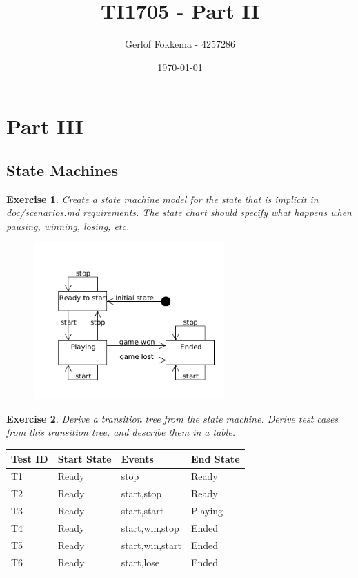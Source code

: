 \documentclass[a4paper]{article}
\title{TI1705 - Part II}
\author{Gerlof Fokkema - 4257286}
\date{\today}
\newtheorem{thm}{Exercise}
\begin{document}
  \maketitle
  \section{Part III}
  
  \subsection{State Machines}
    \begin{thm}
      Create a state machine model for the state that is implicit in \textit{doc/scenarios.md}
      requirements. The state chart should specify what happens when pausing, winning, losing, etc.
    \end{thm}
    \begin{figure}[htb]
      \includegraphics[height=6cm,keepaspectratio]{state}
    \end{figure}

    \begin{thm}
      Derive a transition tree from the state machine.
      Derive test cases from this transition tree, and describe them in a table.
    \end{thm}
    \begin{table}[h]
      \begin{tabular}{|l|l|l|l|}
        \hline
        Test ID & Start State & Events                                  & End State \\ \hline
        T1      & Ready       & stop                                    & Ready     \\ \hline
        T2      & Ready       & start,stop                              & Ready     \\ \hline
        T3      & Ready       & start,start                             & Playing   \\ \hline
        T4      & Ready       & start,win,stop                          & Ended     \\ \hline
        T5      & Ready       & start,win,start                         & Ended     \\ \hline
        T6      & Ready       & start,lose                              & Ended     \\ \hline
      \end{tabular}
    \end{table}
    
\end{document}
